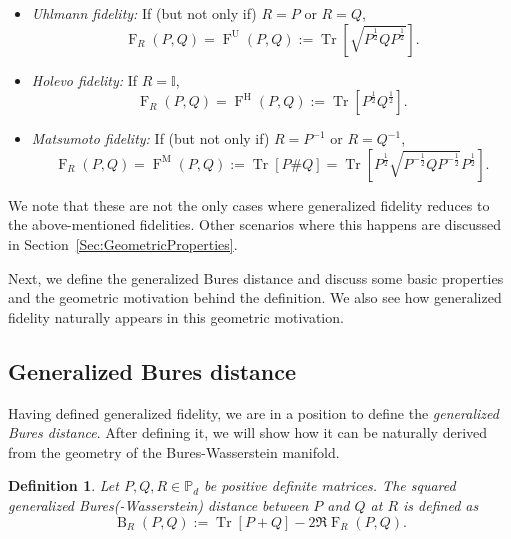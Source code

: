 \documentclass[12pt]{article}
\newtheorem{definition}[theorem]{Definition}
\theoremstyle{definition}
\begin{document}
\begin{enumerate}
    \begin{itemize}
        \item \emph{Uhlmann fidelity:} If (but not only if) $R = P$ or $R = Q$,
        \begin{equation}
        \operatorname{F}_R(P, Q) = \operatorname{F}^\mathrm{U}(P, Q) := \operatorname{Tr}\left[\sqrt{P^\frac12 Q P^\frac12}\right].
        \end{equation}
        \item \emph{Holevo fidelity:} If $R = \mathbb{I}$,
        \begin{equation}
        \operatorname{F}_{R}(P,Q) = \operatorname{F}^\mathrm{H}(P, Q) := \operatorname{Tr}\left[P^\frac12 Q^\frac12\right].
        \end{equation}
        \item \emph{Matsumoto fidelity:} If (but not only if) $R = P^{-1}$ or $R = Q^{-1}$,
        \begin{equation}
        \operatorname{F}_R(P, Q) = \operatorname{F}^\mathrm{M}(P, Q) := \operatorname{Tr}[P \# Q] = \operatorname{Tr}\left[P^\frac12 \sqrt{P^{-\frac 12} Q P^{-\frac 12}} P^\frac12\right].
        \end{equation} 
    \end{itemize}
    We note that these are not the only cases where generalized fidelity reduces to the above-mentioned fidelities. Other scenarios where this happens are discussed in Section~\ref{Sec:GeometricProperties}.
\end{enumerate}

Next, we define the generalized Bures distance and discuss some basic properties and the geometric motivation behind the definition. We also see how generalized fidelity naturally appears in this geometric motivation.

\subsection{Generalized Bures distance}
Having defined generalized fidelity, we are in a position to define the \textit{generalized Bures distance}. After defining it, we will show how it can be naturally derived from the geometry of the Bures-Wasserstein manifold. 


\begin{definitionbox}
    \begin{definition}     Let $P,Q,R \in \mathbb{P}_d$ be positive definite matrices. The squared \emph{generalized Bures(-Wasserstein) distance between}  $P$ \textit{and} $Q$ \textit{at} $R$  is defined as
    \begin{equation}
         \operatorname{B}_R(P, Q) :=  \operatorname{Tr}[P+Q] - 2 \Re \operatorname{F}_R(P,Q).  
    \end{equation} 
\end{definition}
\end{definitionbox}
\end{document}
